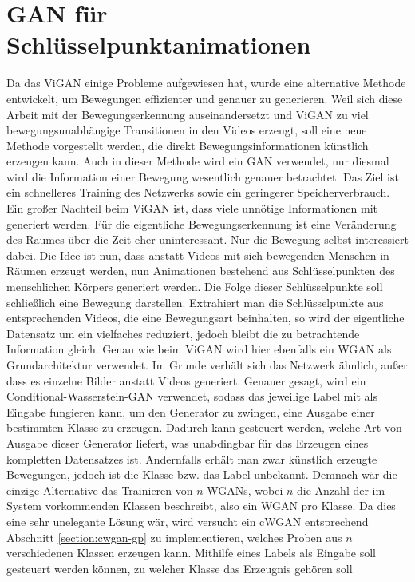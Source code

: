 \section{GAN für Schlüsselpunktanimationen}
Da das ViGAN einige Probleme aufgewiesen hat, wurde eine alternative Methode
entwickelt, um Bewegungen effizienter und genauer zu generieren. Weil sich diese
Arbeit mit der Bewegungserkennung auseinandersetzt und ViGAN zu viel
bewegungsunabhängige Transitionen in den Videos erzeugt, soll eine neue Methode
vorgestellt werden, die direkt Bewegungsinformationen künstlich erzeugen kann.
Auch in dieser Methode wird ein GAN verwendet, nur diesmal wird die Information
einer Bewegung wesentlich genauer betrachtet. Das Ziel ist ein schnelleres
Training des Netzwerks sowie ein geringerer Speicherverbrauch. Ein großer
Nachteil beim ViGAN ist, dass viele unnötige Informationen mit generiert werden.
Für die eigentliche Bewegungserkennung ist eine Veränderung des Raumes über die
Zeit eher uninteressant. Nur die Bewegung selbst interessiert dabei.
Die Idee ist nun, dass anstatt Videos mit sich bewegenden Menschen in Räumen erzeugt werden, nun Animationen
bestehend aus Schlüsselpunkten des menschlichen Körpers generiert werden. Die
Folge dieser Schlüsselpunkte soll schließlich eine Bewegung darstellen.
Extrahiert man die Schlüsselpunkte aus entsprechenden Videos, die eine
Bewegungsart beinhalten, so wird der eigentliche Datensatz um ein vielfaches
reduziert, jedoch bleibt die zu betrachtende Information gleich. Genau
wie beim ViGAN wird hier ebenfalls ein WGAN als Grundarchitektur verwendet. Im
Grunde verhält sich das Netzwerk ähnlich, außer dass es einzelne
Bilder anstatt Videos generiert. Genauer gesagt, wird ein
Conditional-Wasserstein-GAN verwendet, sodass das jeweilige Label mit als
Eingabe fungieren kann, um den Generator zu zwingen, eine Ausgabe einer
bestimmten Klasse zu erzeugen. Dadurch kann gesteuert werden, welche Art von
Ausgabe dieser Generator liefert, was unabdingbar für das Erzeugen eines
kompletten Datensatzes ist. Andernfalls erhält man zwar künstlich erzeugte
Bewegungen, jedoch ist die Klasse bzw. das Label unbekannt. Demnach wär die
einzige Alternative das Trainieren von $n$ WGANs, wobei $n$ die Anzahl der im
System vorkommenden Klassen beschreibt, also ein WGAN pro Klasse. Da dies eine
sehr unelegante Lösung wär, wird versucht ein cWGAN entsprechend Abschnitt
\ref{section:cwgan-gp} zu implementieren, welches Proben aus $n$ verschiedenen
Klassen erzeugen kann. Mithilfe eines Labels als Eingabe soll gesteuert werden
können, zu welcher Klasse das Erzeugnis gehören soll

